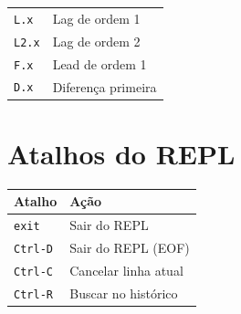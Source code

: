 \begin{center}
\begin{tabular}{ll}
\toprule
\texttt{L.x}   & Lag de ordem 1 \\
\texttt{L2.x}  & Lag de ordem 2 \\
\texttt{F.x}   & Lead de ordem 1 \\
\texttt{D.x}   & Diferença primeira \\
\bottomrule
\end{tabular}
\end{center}

\section{Atalhos do REPL}

\begin{center}
\begin{tabular}{ll}
\toprule
\textbf{Atalho}  & \textbf{Ação} \\
\midrule
\texttt{exit}    & Sair do REPL \\
\texttt{Ctrl-D}  & Sair do REPL (EOF) \\
\texttt{Ctrl-C}  & Cancelar linha atual \\
\texttt{Ctrl-R}  & Buscar no histórico \\
\bottomrule
\end{tabular}
\end{center}
